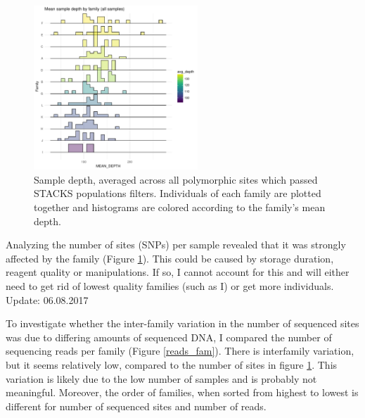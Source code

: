 \documentclass[10pt,a4paper]{report}
\begin{document}
\begin{figure}[h]
	\begin{center}
		\includegraphics[width=0.55\textwidth]{coverage_analysis/cov_per_sample.pdf}
		\caption{Sample depth, averaged across all polymorphic sites which passed STACKS populations filters. Individuals of each family are plotted together and histograms are colored according to the family's mean depth.}
		\label{sites_fam}
	\end{center}
\end{figure}

Analyzing the number of sites (SNPs) per sample revealed that it was strongly affected by the family (Figure \ref{sites_fam}). This could be caused by storage duration, reagent quality or manipulations. If so, I cannot account for this and will either need to get rid of lowest quality families (such as I) or get more individuals.\\

Update: 06.08.2017

To investigate whether the inter-family variation in the number of sequenced sites was due to differing amounts of sequenced DNA, I compared the number of sequencing reads per family (Figure \ref{reads_fam}). There is interfamily variation, but it seems relatively low, compared to the number of sites in figure \ref{sites_fam}. This variation is likely due to the low number of samples and is probably not meaningful. Moreover, the order of families, when sorted from highest to lowest is different for number of sequenced sites and number of reads. 
\end{document}
